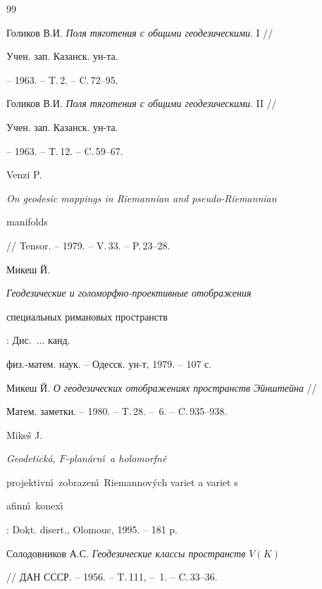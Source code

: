 \begin{thebibliography}{99}


Голиков В.И. {\em Поля тяготения с общими геодезическими}. I //


Учен. зап. Казанск. ун-та. 


-- 1963. -- T.\,2. -- C.\,72--95.







Голиков В.И. {\em Поля тяготения с общими геодезическими}. II //


Учен. зап. Казанск. ун-та. 


-- 1963. -- T.\,12. -- C.\,59--67.







Venzi P. {\em On geodesic mappings in Riemannian and pseudo-Riemannian


manifolds} // Tensor. -- 1979. -- V.\,33. -- P.\,23--28.







Микеш Й. {\em Геодезические и голоморфно-проективные отображения


специальных римановых пространств}: Дис.~$\dotsc$ канд.


физ.-матем. наук. -- Одесск. ун-т, 1979. -- 107 с.







Микеш Й. {\em О геодезических отображениях пространств Эйнштейна} //


Матем. заметки. -- 1980. -- T.\,28. -- \No\,6. -- C.\,935--938.







Mike\v s J. {\em Geodetick\'a, $F$-plan\'arn\'\i\ a holomorfn\v e


projektivn\'\i\ zobrazen\'\i\ Riemannov\'ych variet a variet s


afinn\'\i\ konex\'\i}\/: Dokt. disert., Olomouc, 1995. -- 181 p.







Солодовников А.С. {\em Геодезические классы пространств $V(K)$}


// ДАН СССР. -- 1956. -- T.\,111, -- \No\,1. -- C.\,33--36.






\end{thebibliography}
